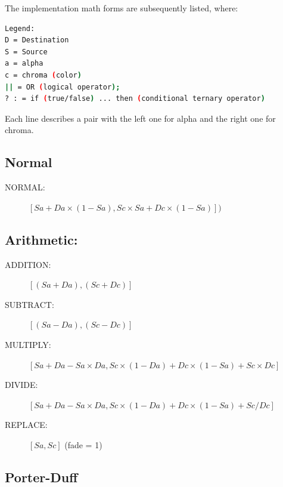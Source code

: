 The implementation math forms are subsequently listed, where:

\vspace{2ex}
\begin{lstlisting}[language=bash]
Legend:
D = Destination
S = Source
a = alpha
c = chroma (color)
|| = OR (logical operator); 
? : = if (true/false) ... then (conditional ternary operator)
\end{lstlisting}

Each line describes a pair with the left one for alpha and the right one for chroma.

\subsection*{Normal}%
\label{sub:normal}

\begin{description}
    \item[NORMAL:] $[Sa + Da \times (1 - Sa), Sc \times Sa + Dc \times(1 - Sa)])$
\end{description}

\subsection*{Arithmetic:}%
\label{sub:arithmetic}

\begin{description}
    \item[ADDITION:] $[(Sa + Da), (Sc + Dc)]$
    \item[SUBTRACT:] $[(Sa - Da), (Sc - Dc)]$
    \item[MULTIPLY:] $[Sa + Da - Sa \times Da, Sc\times(1 - Da) + Dc\times (1 - Sa) + Sc \times Dc]$
    \item[DIVIDE:] $[Sa + Da - Sa \times Da, Sc\times(1 - Da) + Dc \times (1 - Sa) + Sc/Dc]$
    \item[REPLACE:] $[Sa, Sc]$ (fade = 1)
\end{description}

\subsection*{Porter-Duff}%
\label{sub:porter-duff}

